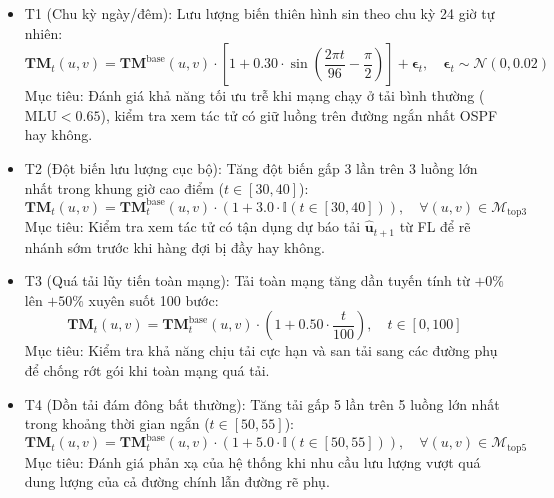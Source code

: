 \documentclass[11pt,a4paper]{article}
\begin{document}
\begin{itemize}[leftmargin=1.5em, itemsep=0.3ex]
    \item T1 (Chu kỳ ngày/đêm): Lưu lượng biến thiên hình sin theo chu kỳ 24 giờ tự nhiên:
    \begin{equation}
        \mathbf{TM}_t(u, v) = \mathbf{TM}^{\text{base}}(u, v) \cdot \left[ 1 + 0.30 \cdot \sin\left(\frac{2\pi t}{96} - \frac{\pi}{2}\right) \right] + \boldsymbol{\epsilon}_t, \quad \boldsymbol{\epsilon}_t \sim \mathcal{N}(0, 0.02)
    \end{equation}
    Mục tiêu: Đánh giá khả năng tối ưu trễ khi mạng chạy ở tải bình thường ($\text{MLU} < 0.65$), kiểm tra xem tác tử có giữ luồng trên đường ngắn nhất OSPF hay không.

    \item T2 (Đột biến lưu lượng cục bộ): Tăng đột biến gấp 3 lần trên 3 luồng lớn nhất trong khung giờ cao điểm ($t \in [30, 40]$):
    \begin{equation}
        \mathbf{TM}_t(u, v) = \mathbf{TM}_t^{\text{base}}(u, v) \cdot \left( 1 + 3.0 \cdot \mathbb{I}(t \in [30, 40]) \right), \quad \forall (u, v) \in \mathcal{M}_{\text{top3}}
    \end{equation}
    Mục tiêu: Kiểm tra xem tác tử có tận dụng dự báo tải $\mathbf{\hat{u}}_{t+1}$ từ FL để rẽ nhánh sớm trước khi hàng đợi bị đầy hay không.

    \item T3 (Quá tải lũy tiến toàn mạng): Tải toàn mạng tăng dần tuyến tính từ $+0\%$ lên $+50\%$ xuyên suốt 100 bước:
    \begin{equation}
        \mathbf{TM}_t(u, v) = \mathbf{TM}_t^{\text{base}}(u, v) \cdot \left( 1 + 0.50 \cdot \frac{t}{100} \right), \quad t \in [0, 100]
    \end{equation}
    Mục tiêu: Kiểm tra khả năng chịu tải cực hạn và san tải sang các đường phụ để chống rớt gói khi toàn mạng quá tải.

    \item T4 (Dồn tải đám đông bất thường): Tăng tải gấp 5 lần trên 5 luồng lớn nhất trong khoảng thời gian ngắn ($t \in [50, 55]$):
    \begin{equation}
        \mathbf{TM}_t(u, v) = \mathbf{TM}_t^{\text{base}}(u, v) \cdot \left( 1 + 5.0 \cdot \mathbb{I}(t \in [50, 55]) \right), \quad \forall (u, v) \in \mathcal{M}_{\text{top5}}
    \end{equation}
    Mục tiêu: Đánh giá phản xạ của hệ thống khi nhu cầu lưu lượng vượt quá dung lượng của cả đường chính lẫn đường rẽ phụ.


\end{itemize}
\end{document}
